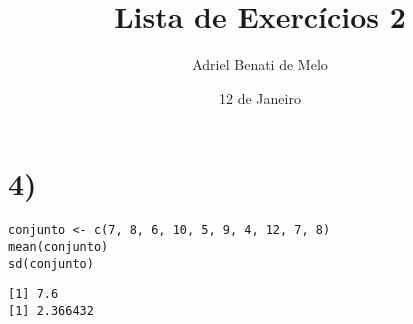 \documentclass[11pt]{article}
\author{Adriel Benati de Melo}
\date{12 de Janeiro}
\title{Lista de Exercícios 2}
\begin{document}
\maketitle

\section*{4)}
\label{sec:orgb80aa81}

\begin{verbatim}
conjunto <- c(7, 8, 6, 10, 5, 9, 4, 12, 7, 8)
mean(conjunto)
sd(conjunto)
\end{verbatim}

\begin{verbatim}
[1] 7.6
[1] 2.366432
\end{verbatim}
\end{document}
